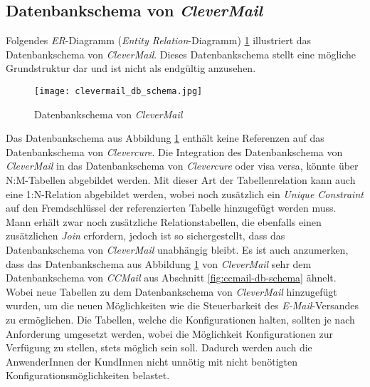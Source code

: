 \subsection{Datenbankschema von \emph{CleverMail}}
Folgendes \emph{ER}-Diagramm (\emph{Entity Relation}-Diagramm) \ref{fig:clevermail-db-schema} illustriert das Datenbankschema von \emph{CleverMail}. Dieses Datenbankschema stellt eine mögliche Grundstruktur dar und ist nicht als endgültig anzusehen.
\begin{figure}[H]
\centering
\texttt{[image: clevermail\_db\_schema.jpg]}
\caption{Datenbankschema von \emph{CleverMail}}
\label{fig:clevermail-db-schema}
\end{figure}
Das Datenbankschema aus Abbildung \ref{fig:clevermail-db-schema} enthält keine Referenzen auf das Datenbankschema von \emph{Clevercure}. Die Integration des Datenbankschema von \emph{CleverMail} in das Datenbankschema von \emph{Clevercure} oder visa versa, könnte über N:M-Tabellen abgebildet werden. Mit dieser Art der Tabellenrelation kann auch eine 1:N-Relation abgebildet werden, wobei noch zusätzlich ein \emph{Unique Constraint} auf den Fremdschlüssel der referenzierten Tabelle hinzugefügt werden muss. Mann erhält zwar noch zusätzliche Relationstabellen, die ebenfalls einen zusätzlichen \emph{Join} erfordern, jedoch ist so sichergestellt, dass das Datenbankschema von \emph{CleverMail} unabhängig bleibt.
\newline
\newline
Es ist auch anzumerken, dass das Datenbankschema aus Abbildung \ref{fig:clevermail-db-schema} von \emph{CleverMail} sehr dem Datenbankschema von \emph{CCMail} aus Abschnitt \ref{fig:ccmail-db-schema} ähnelt. Wobei neue Tabellen zu dem Datenbankschema von \emph{CleverMail} hinzugefügt wurden, um die neuen Möglichkeiten wie die Steuerbarkeit des \emph{E-Mail}-Versandes zu ermöglichen. 
\newline
\newline
Die Tabellen, welche die Konfigurationen halten, sollten je nach Anforderung umgesetzt werden, wobei die Möglichkeit Konfigurationen zur Verfügung zu stellen, stets möglich sein soll. Dadurch werden auch die AnwenderInnen der KundInnen nicht unnötig mit nicht benötigten Konfigurationsmöglichkeiten belastet.